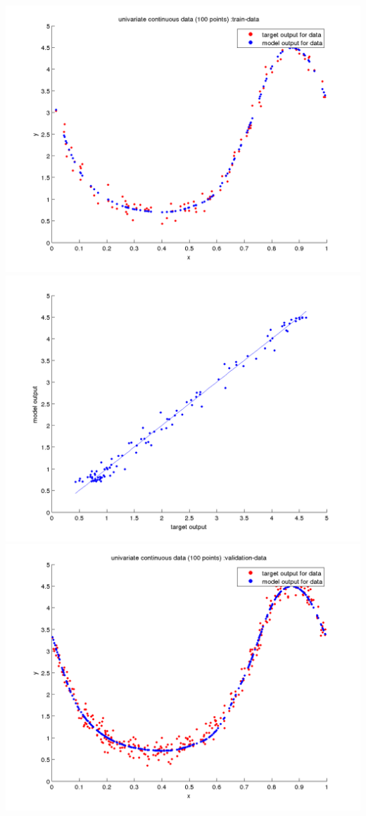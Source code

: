 \documentclass[fleqn]{article}
\begin{document}
\includegraphics[scale=0.4]{./pics/univariate100/_6/_6_epoch_Inf_train-data_scatter3d}
\includegraphics[scale=0.4]{./pics/univariate100/_6/_6_epoch_Inf_train-data_scatter2d}
\includegraphics[scale=0.4]{./pics/univariate100/_6/_6_epoch_Inf_validation-data_scatter3d}
\end{document}
